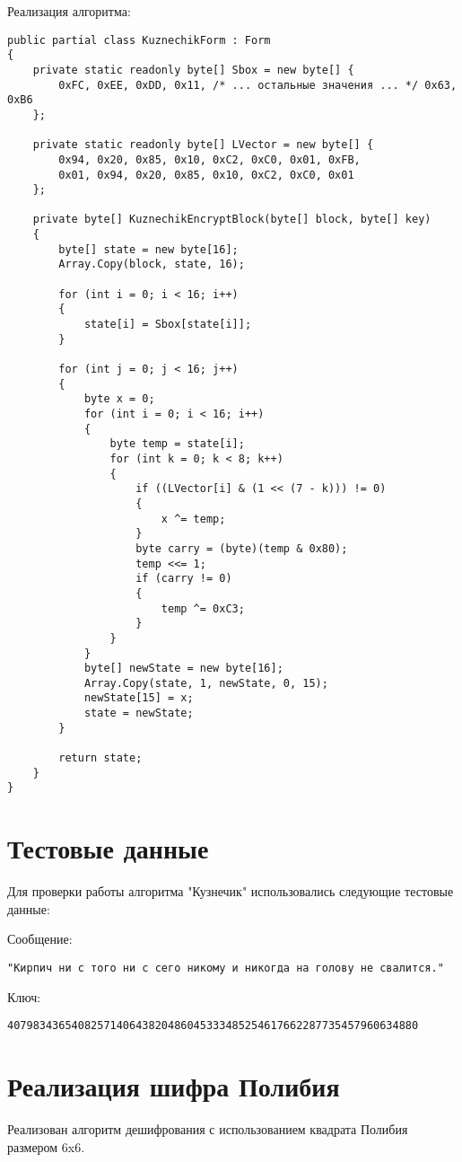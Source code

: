 \documentclass[a4paper, 14pt]{extarticle}
\begin{document}
Реализация алгоритма:
\begin{lstlisting}[caption=Реализация алгоритма Кузнечик]
public partial class KuznechikForm : Form
{
    private static readonly byte[] Sbox = new byte[] {
        0xFC, 0xEE, 0xDD, 0x11, /* ... остальные значения ... */ 0x63, 0xB6
    };

    private static readonly byte[] LVector = new byte[] {
        0x94, 0x20, 0x85, 0x10, 0xC2, 0xC0, 0x01, 0xFB,
        0x01, 0x94, 0x20, 0x85, 0x10, 0xC2, 0xC0, 0x01
    };

    private byte[] KuznechikEncryptBlock(byte[] block, byte[] key)
    {
        byte[] state = new byte[16];
        Array.Copy(block, state, 16);

        for (int i = 0; i < 16; i++)
        {
            state[i] = Sbox[state[i]];
        }

        for (int j = 0; j < 16; j++)
        {
            byte x = 0;
            for (int i = 0; i < 16; i++)
            {
                byte temp = state[i];
                for (int k = 0; k < 8; k++)
                {
                    if ((LVector[i] & (1 << (7 - k))) != 0)
                    {
                        x ^= temp;
                    }
                    byte carry = (byte)(temp & 0x80);
                    temp <<= 1;
                    if (carry != 0)
                    {
                        temp ^= 0xC3;
                    }
                }
            }
            byte[] newState = new byte[16];
            Array.Copy(state, 1, newState, 0, 15);
            newState[15] = x;
            state = newState;
        }

        return state;
    }
}
\end{lstlisting}

\section{Тестовые данные}
Для проверки работы алгоритма "Кузнечик" использовались следующие тестовые данные:

Сообщение:
\begin{lstlisting}
"Кирпич ни с того ни с сего никому и никогда на голову не свалится."
\end{lstlisting}

Ключ:
\begin{lstlisting}
4079834365408257140643820486045333485254617662287735457960634880
\end{lstlisting}

\section{Реализация шифра Полибия}
Реализован алгоритм дешифрования с использованием квадрата Полибия размером 6x6. 
\end{document}
